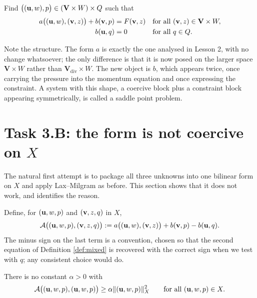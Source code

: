 \documentclass[11pt,a4paper]{article}
\newcommand{\Vdiv}{\mathbf{V}_{\mathrm{div}}}
\newcommand{\Vsp}{\mathbf{V}}
\newcommand{\Qsp}{Q}
\newcommand{\Wsp}{W}
\newcommand{\Xsp}{X}
\begin{document}
\begin{definition}\label{def:mixed}
Find $\big( (\bu,w), p \big) \in (\Vsp \times \Wsp) \times \Qsp$ such that
\begin{align}
  a\big( (\bu,w),(\bv,z) \big) + b(\bv, p) &= F(\bv,z)
    &&\text{for all } (\bv,z) \in \Vsp \times \Wsp , \label{eq:mixed1} \\
  b(\bu, q) &= 0
    &&\text{for all } q \in \Qsp . \label{eq:mixed2}
\end{align}
\end{definition}

Note the structure. The form $a$ is exactly the one analysed in Lesson 2, with
no change whatsoever; the only difference is that it is now posed on the larger
space $\Vsp \times \Wsp$ rather than $\Vdiv \times \Wsp$. The new object is $b$,
which appears twice, once carrying the pressure into the momentum equation and
once expressing the constraint. A system with this shape, a coercive block plus
a constraint block appearing symmetrically, is called a saddle point problem.

\section{Task 3.B: the form is not coercive on $\Xsp$}
\label{sec:notcoercive}

The natural first attempt is to package all three unknowns into one bilinear
form on $\Xsp$ and apply Lax--Milgram as before. This section shows that it does
not work, and identifies the reason.

Define, for $(\mathbf{u},w,p)$ and $(\mathbf{v},z,q)$ in $\Xsp$,
\begin{equation}\label{eq:calA}
  \mathcal{A}\big( (\mathbf{u},w,p),(\mathbf{v},z,q) \big)
  := a\big( (\mathbf{u},w),(\mathbf{v},z) \big) + b(\mathbf{v},p) - b(\mathbf{u},q) .
\end{equation}
The minus sign on the last term is a convention, chosen so that the second
equation of Definition \ref{def:mixed} is recovered with the correct sign when
we test with $q$; any consistent choice would do.

\begin{proposition}[No coercivity on $\Xsp$]\label{prop:nocoerc}
There is no constant $\alpha > 0$ with
\[
  \mathcal{A}\big( (\bu,w,p),(\bu,w,p) \big)
  \ge \alpha \lVert (\bu,w,p) \rVert_{\Xsp}^{2}
  \qquad \text{for all } (\bu,w,p) \in \Xsp .
\]
\end{proposition}
\end{document}
